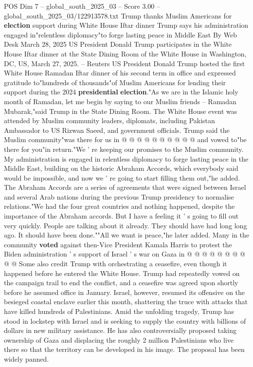 \begin{textsample}{POS Dim 7 – global\_south\_2025\_03 – Score 3.00 – global\_south\_2025\_03/122913578.txt}  \label{ex:f7_pos_435}
Trump thanks Muslim Americans for \textbf{election} support during White House Iftar dinner Trump says his administration engaged in"relentless diplomacy"to forge lasting peace in Middle East By Web Desk March 28, 2025 US President Donald Trump participates in the White House Iftar dinner at the State Dining Room of the White House in Washington, DC, US, March 27, 2025. -- Reuters US President Donald Trump hosted the first White House Ramadan Iftar dinner of his second term in office and expressed gratitude to"hundreds of thousands"of Muslim Americans for lending their support during the 2024 \textbf{presidential} \textbf{election}."As we are in the Islamic holy month of Ramadan, let me begin by saying to our Muslim friends -- Ramadan Mubarak,"said Trump in the State Dining Room.
The White House event was attended by Muslim community leaders, diplomats, including Pakistan Ambassador to US Rizwan Saeed, and government officials.
Trump said the Muslim community"was there for us in @ @ @ @ @ @ @ @ @ @ and vowed to"be there for you"in return."We ' re keeping our promises to the Muslim community.
My administration is engaged in relentless diplomacy to forge lasting peace in the Middle East, building on the historic Abraham Accords, which everybody said would be impossible, and now we ' re going to start filling them out,"he added.
The Abraham Accords are a series of agreements that were signed between Israel and several Arab nations during the previous Trump presidency to normalise relations."We had the four great countries and nothing happened, despite the importance of the Abraham accords.
But I have a feeling it ' s going to fill out very quickly.
People are talking about it already.
They should have had long long ago.
It should have been done.""All we want is peace,"he later added.
Many in the community \textbf{voted} against then-Vice President Kamala Harris to protest the Biden administration ' s support of Israel ' s war on Gaza in @ @ @ @ @ @ @ @ @ @ Some also credit Trump with orchestrating a ceasefire, even though it happened before he entered the White House.
Trump had repeatedly vowed on the campaign trail to end the conflict, and a ceasefire was agreed upon shortly before he assumed office in January.
Israel, however, resumed its offensive on the besieged coastal enclave earlier this month, shattering the truce with attacks that have killed hundreds of Palestinians.
Amid the unfolding tragedy, Trump has stood in lockstep with Israel and is seeking to supply the country with billions of dollars in new military assistance.
He has also controversially proposed taking ownership of Gaza and displacing the roughly 2 million Palestinians who live there so that the territory can be developed in his image.
The proposal has been widely panned.

\end{textsample}
